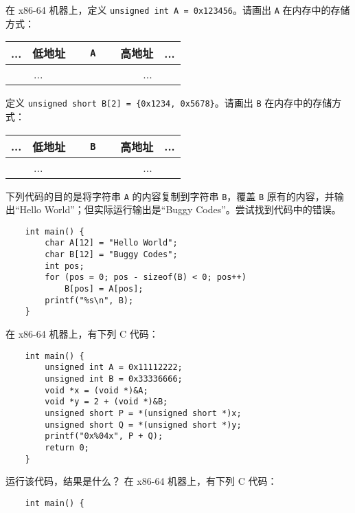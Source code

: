	\begin{problems}
		\pro 在 x86-64 机器上，定义 \texttt{unsigned int A = 0x123456}。请画出 \texttt{A} 在内存中的存储方式：
		\begin{table}[H]
			\centering
			\begin{tabular}{|c|c|c|c|c|c|c|c|}
				\hline
				... & 低地址 & \multicolumn{4}{c|}{\texttt{A}} & 高地址 & ... \\ \hline
				\multicolumn{2}{|c|}{...} & {\qquad \qquad} & {\qquad \qquad} & {\qquad \qquad} & {\qquad \qquad} & \multicolumn{2}{c|}{...} \\ \hline
			\end{tabular}
		\end{table}
		定义 \texttt{unsigned short B[2] = \{0x1234, 0x5678\}}。请画出 \texttt{B} 在内存中的存储方式：
		\begin{table}[H]
			\centering
			\begin{tabular}{|c|c|c|c|c|c|c|c|}
				\hline
				... & 低地址 & \multicolumn{4}{c|}{\texttt{B}} & 高地址 & ... \\ \hline
				\multicolumn{2}{|c|}{...} & {\qquad \qquad} & {\qquad \qquad} & {\qquad \qquad} & {\qquad \qquad} & \multicolumn{2}{c|}{...} \\ \hline
			\end{tabular}
		\end{table}
		\pro 下列代码的目的是将字符串 \texttt{A} 的内容复制到字符串 \texttt{B}，覆盖 \texttt{B} 原有的内容，并输出“Hello World”；但实际运行输出是“Buggy Codes”。尝试找到代码中的错误。
		\begin{verbatim}
    int main() {
        char A[12] = "Hello World";
        char B[12] = "Buggy Codes";
        int pos;
        for (pos = 0; pos - sizeof(B) < 0; pos++)
            B[pos] = A[pos];
        printf("%s\n", B);
    }
		\end{verbatim}
		\pro 在 x86-64 机器上，有下列 C 代码：
		\begin{verbatim}
    int main() {
        unsigned int A = 0x11112222;
        unsigned int B = 0x33336666;
        void *x = (void *)&A;
        void *y = 2 + (void *)&B;
        unsigned short P = *(unsigned short *)x;
        unsigned short Q = *(unsigned short *)y;
        printf("0x%04x", P + Q);
        return 0;
    }
		\end{verbatim}
		运行该代码，结果是什么？
		\pro 在 x86-64 机器上，有下列 C 代码：
		\begin{verbatim}
    int main() {

\end{verbatim}
\end{problems}
